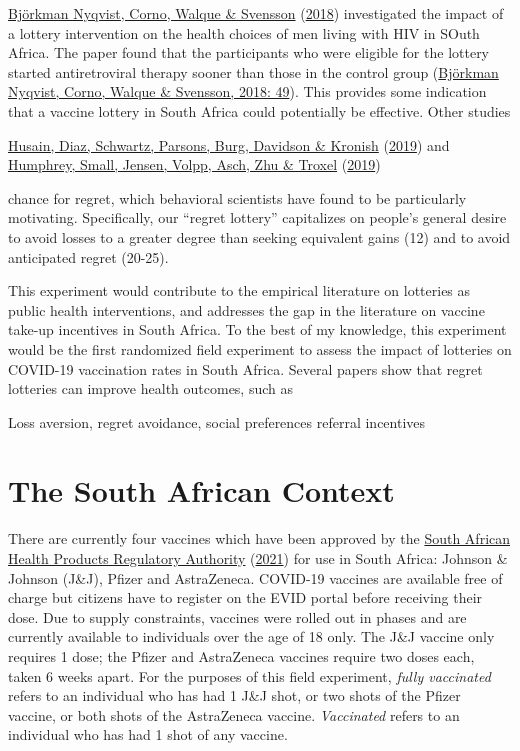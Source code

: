 \documentclass[11pt,preprint, authoryear]{elsarticle}
\numberwithin{equation}{section}
\numberwithin{figure}{section}
\numberwithin{table}{section}
\begin{document}
\protect\hyperlink{ref-hiv}{Björkman Nyqvist, Corno, Walque \& Svensson}
(\protect\hyperlink{ref-hiv}{2018}) investigated the impact of a lottery
intervention on the health choices of men living with HIV in SOuth
Africa. The paper found that the participants who were eligible for the
lottery started antiretroviral therapy sooner than those in the control
group (\protect\hyperlink{ref-hiv}{Björkman Nyqvist, Corno, Walque \&
Svensson, 2018: 49}). This provides some indication that a vaccine
lottery in South Africa could potentially be effective. Other studies

\protect\hyperlink{ref-regr}{Husain, Diaz, Schwartz, Parsons, Burg,
Davidson \& Kronish} (\protect\hyperlink{ref-regr}{2019}) and
\protect\hyperlink{ref-adhere}{Humphrey, Small, Jensen, Volpp, Asch, Zhu
\& Troxel} (\protect\hyperlink{ref-adhere}{2019})

chance for regret, which behavioral scientists have found to be
particularly motivating. Specifically, our ``regret lottery''
capitalizes on people's general desire to avoid losses to a greater
degree than seeking equivalent gains (12) and to avoid anticipated
regret (20-25).

This experiment would contribute to the empirical literature on
lotteries as public health interventions, and addresses the gap in the
literature on vaccine take-up incentives in South Africa. To the best of
my knowledge, this experiment would be the first randomized field
experiment to assess the impact of lotteries on COVID-19 vaccination
rates in South Africa. Several papers show that regret lotteries can
improve health outcomes, such as

Loss aversion, regret avoidance, social preferences referral incentives

\hypertarget{the-south-african-context}{%
\section{\texorpdfstring{The South African Context
\label{context}}{The South African Context }}\label{the-south-african-context}}

There are currently four vaccines which have been approved by the
\protect\hyperlink{ref-sah}{South African Health Products Regulatory
Authority} (\protect\hyperlink{ref-sah}{2021}) for use in South Africa:
Johnson \& Johnson (J\&J), Pfizer and AstraZeneca. COVID-19 vaccines are
available free of charge but citizens have to register on the EVID
portal before receiving their dose. Due to supply constraints, vaccines
were rolled out in phases and are currently available to individuals
over the age of 18 only. The J\&J vaccine only requires 1 dose; the
Pfizer and AstraZeneca vaccines require two doses each, taken 6 weeks
apart. For the purposes of this field experiment, \emph{fully
vaccinated} refers to an individual who has had 1 J\&J shot, or two
shots of the Pfizer vaccine, or both shots of the AstraZeneca vaccine.
\emph{Vaccinated} refers to an individual who has had 1 shot of any
vaccine.
\end{document}
